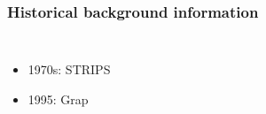 \documentclass{beamer}
\let\origframetitle=\frametitle
\renewcommand\frametitle[1]{\origframetitle{\textbf{\large{\textrm{#1}}}}}
\begin{document}
\begin{frame}
  \frametitle{Historical background information}

  \begin{columns}

    \begin{itemize}
      \item 1970s: STRIPS
      \item 1995: Grap
\end{itemize}
\end{columns}
\end{frame}
\end{document}

